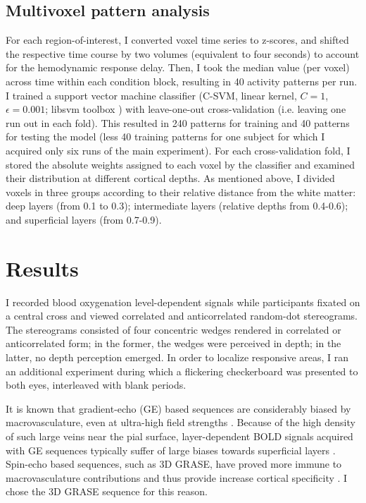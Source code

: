 \subsection{Multivoxel pattern analysis}
For each region-of-interest, I converted voxel time series to z-scores, and shifted the respective time course by two volumes (equivalent to four seconds) to account for the hemodynamic response delay. Then, I took the median value (per voxel) across time within each condition block, resulting in 40 activity patterns per run. I trained a support vector machine classifier (C-SVM, linear kernel, $C=1$, $\epsilon=0.001$; libsvm toolbox \cite{Chang:2011:LLS:1961189.1961199}) with leave-one-out cross-validation (i.e. leaving one run out in each fold). This resulted in 240 patterns for training and 40 patterns for testing the model (less 40 training patterns for one subject for which I acquired only six runs of the main experiment). For each cross-validation fold, I stored the absolute weights assigned to each voxel by the classifier and examined their distribution at different cortical depths. As mentioned above, I divided voxels in three groups according to their relative distance from the white matter: deep layers (from 0.1 to 0.3); intermediate layers (relative depths from 0.4-0.6); and superficial layers (from 0.7-0.9).

\section{Results}
I recorded blood oxygenation level-dependent signals while participants fixated on a central cross and viewed correlated and anticorrelated random-dot stereograms. The stereograms consisted of four concentric wedges rendered in correlated  or anticorrelated form; in the former, the wedges were perceived in depth; in the latter, no depth perception emerged. In order to localize responsive areas, I ran an additional experiment during which a flickering checkerboard was presented to both eyes, interleaved with blank periods.

It is known that gradient-echo (GE) based sequences are considerably biased by macrovasculature, even at ultra-high field strengths \cite{DeMartino:2013qy}. Because of the high density of such large veins near the pial surface, layer-dependent BOLD signals acquired with GE sequences typically suffer of large biases towards superficial layers \cite{Polimeni:2010fl,Koopmans:2010hq}. Spin-echo based sequences, such as 3D GRASE, have proved more immune to macrovasculature contributions and thus provide increase cortical specificity \cite{DeMartino:2013qy}. I chose the 3D GRASE sequence for this reason.

